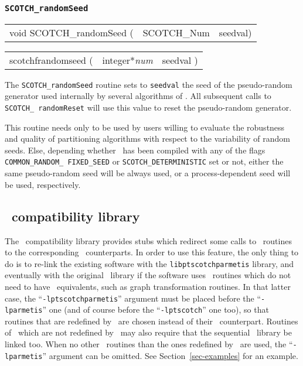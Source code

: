 \subsubsection{{\tt SCOTCH\_randomSeed}}

\begin{itemize}
\progsyn

{\tt\begin{tabular}{l@{}ll}
void SCOTCH\_randomSeed ( & SCOTCH\_Num & seedval)
\end{tabular}}

{\tt\begin{tabular}{l@{}ll}
scotchfrandomseed ( & integer*{\it num} & seedval )
\end{tabular}}

\progdes

The {\tt SCOTCH\_randomSeed} routine sets to {\tt seedval} the
seed of the pseudo-random generator used internally by several
algorithms of \scotch. All subsequent calls to {\tt SCOTCH\_\lbt
random\lbt Reset} will use this value to reset the pseudo-random
generator.

This routine needs only to be used by users willing to evaluate
the robustness and quality of partitioning algorithms with respect to
the variability of random seeds. Else, depending whether \scotch\ has
been compiled with any of the flags {\tt COMMON\_\lbt RANDOM\_\lbt
FIXED\_\lbt SEED} or {\tt SCOTCH\_\lbt DETERMINISTIC} set or not,
either the same pseudo-random seed will be always used, or a
process-dependent seed will be used, respectively.
\end{itemize}

\subsection{\parmetis\ compatibility library}
\label{sec-lib-parmetis}

The \parmetis\ compatibility library provides stubs which redirect some
calls to \parmetis\ routines to the corresponding \ptscotch\ counterparts.
In order to use this feature, the only thing to do is to re-link the
existing software with the {\tt lib\lbo ptscotch\lbo parmetis} library, and
eventually with the original \parmetis\ library if the software uses
\parmetis\ routines which do not need to have \ptscotch\ equivalents, such
as graph transformation routines.
In that latter case, the ``{\tt -lptscotch\lbt parmetis}'' argument must be
placed before the ``{\tt -lparmetis}'' one (and of course before the
``{\tt -lptscotch}'' one too), so that routines that are redefined by
\ptscotch\ are chosen instead of their \parmetis\ counterpart. Routines
of \parmetis\ which are not redefined by \ptscotch\ may also require
that the sequential \metis\ library be linked too. When no other
\parmetis\ routines than the ones redefined by \ptscotch\ are used,
the ``{\tt -lparmetis}'' argument can be omitted. See
Section~\ref{sec-examples} for an example.

